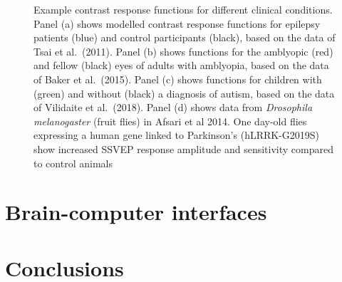 \documentclass[
  letterpaper,
  DIV=11,
  numbers=noendperiod]{scrartcl}
\begin{document}
\begin{figure}


\caption{\label{fig-plotclinical}Example contrast response functions for
different clinical conditions. Panel (a) shows modelled contrast
response functions for epilepsy patients (blue) and control participants
(black), based on the data of Tsai et al.~(2011). Panel (b) shows
functions for the amblyopic (red) and fellow (black) eyes of adults with
amblyopia, based on the data of Baker et al.~(2015). Panel (c) shows
functions for children with (green) and without (black) a diagnosis of
autism, based on the data of Vilidaite et al.~(2018). Panel (d) shows
data from \emph{Drosophila melanogaster} (fruit flies) in Afsari et al
2014. One day-old flies expressing a human gene linked to Parkinson's
(hLRRK-G2019S) show increased SSVEP response amplitude and sensitivity
compared to control animals}

\end{figure}%

\section{Brain-computer interfaces}\label{brain-computer-interfaces}

\section{Conclusions}\label{conclusions}
\end{document}
